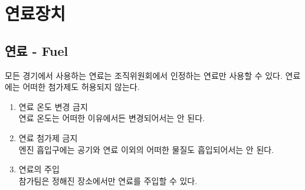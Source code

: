 \documentclass[final,a4paper,10pt]{report}
\begin{document}
\chapter{연료장치}

\section{연료 - Fuel} \label{section:연료}
모든 경기에서 사용하는 연료는 조직위원회에서 인정하는 연료만 사용할 수 있다. 연료에는 어떠한 첨가제도 허용되지 않는다.

\begin{enumerate}
  \item 연료 온도 변경 금지\\
    연료 온도는 어떠한 이유에서든 변경되어서는 안 된다.
  \item 연료 첨가제 금지\\
    엔진 흡입구에는 공기와 연료 이외의 어떠한 물질도 흡입되어서는 안 된다.
  \item 연료의 주입\\
    참가팀은 정해진 장소에서만 연료를 주입할 수 있다.
\end{enumerate}
\end{document}
